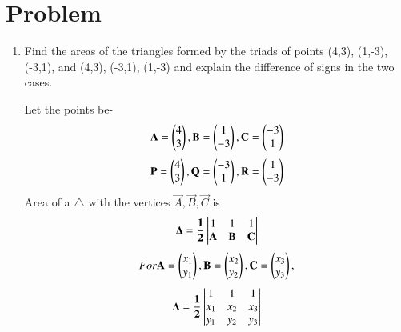 \documentclass[journal,12pt,twocolumn]{IEEEtran}
\renewcommand\thesection{\arabic{section}}
\begin{document}
\renewcommand{\thefigure}{\theenumi}
\renewcommand{\thetable}{\theenumi}

\section{Problem}
\renewcommand{\theequation}{\theenumi}
\begin{enumerate}[label=\thesection.\arabic*.,ref=\thesection.\theenumi]

\item Find the areas of the triangles formed by the triads of points (4,3), (1,-3), (-3,1), and (4,3), (-3,1), (1,-3) and explain the difference of signs in the two cases.

\solution
Let the points be-
\begin{align}
\mathbf{A} = \begin{pmatrix}4\\3\end{pmatrix}, \mathbf{B} =\begin{pmatrix}1\\-3\end{pmatrix}, \mathbf{C} =\begin{pmatrix}-3\\1\end{pmatrix}
\end{align}
\begin{align}
\mathbf{P} =\begin{pmatrix}4\\3\end{pmatrix}, \mathbf{Q} =\begin{pmatrix}-3\\1\end{pmatrix}, \mathbf{R} =\begin{pmatrix}1\\-3\end{pmatrix} 
\end{align}
Area of a $\triangle$ with the vertices
$\vec{A}, \vec{B}, \vec{C}$ is
\begin{align}
\label{eq:area_tri_1}
\mathbf{\Delta = \frac{1}{2}}
\begin{vmatrix}1 & 1 & 1\\ \mathbf{A} & \mathbf{B} & \mathbf{C} \end{vmatrix}
\end{align}
\begin{equation}
For \mathbf{A} = \begin{pmatrix}x_{1}\\y_{1}\end{pmatrix}, \mathbf{B} =\begin{pmatrix}x_{2}\\y_{2}\end{pmatrix}, \mathbf{C} =\begin{pmatrix}x_{3}\\y_{3}\end{pmatrix},
\end{equation}
\begin{align}
\label{eq:area_tri_2}
\mathbf{\Delta = \frac{1}{2}\begin{vmatrix}1 & 1 & 1\\ x_{1}& x_{2} & x_{3}\\ y_{1} & y_{2} & y_{3}\end{vmatrix}}
\end{align}


\end{enumerate}
\end{document}
